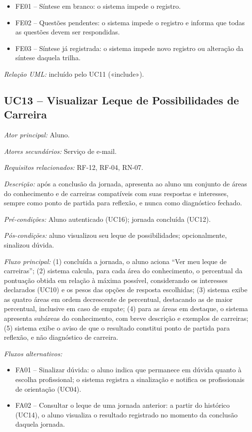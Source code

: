 \begin{itemize}[label={},leftmargin=\parindent,itemsep=0pt,topsep=0pt]
  \item FE01 – Síntese em branco: o sistema impede o registro.
  \item FE02 – Questões pendentes: o sistema impede o registro e informa que todas as questões devem ser respondidas.
  \item FE03 – Síntese já registrada: o sistema impede novo registro ou alteração da síntese daquela trilha.
\end{itemize}

\textit{Relação UML:} incluído pelo UC11 («include»).

\subsection*{UC13 -- Visualizar Leque de Possibilidades de Carreira}\label{uc:uc13}

\textit{Ator principal:} Aluno.

\textit{Atores secundários:} Serviço de e-mail.

\textit{Requisitos relacionados:} RF-12, RF-04, RN-07.

\textit{Descrição:} após a conclusão da jornada, apresenta ao aluno um conjunto de áreas do conhecimento e de carreiras compatíveis com suas respostas e interesses, sempre como ponto de partida para reflexão, e nunca como diagnóstico fechado.

\textit{Pré-condições:} Aluno autenticado (UC16); jornada concluída (UC12).

\textit{Pós-condições:} aluno visualizou seu leque de possibilidades; opcionalmente, sinalizou dúvida.

\textit{Fluxo principal:} (1) concluída a jornada, o aluno aciona ``Ver meu leque de carreiras''; (2) sistema calcula, para cada área do conhecimento, o percentual da pontuação obtida em relação à máxima possível, considerando os interesses declarados (UC10) e os pesos das opções de resposta escolhidas; (3) sistema exibe as quatro áreas em ordem decrescente de percentual, destacando as de maior percentual, inclusive em caso de empate; (4) para as áreas em destaque, o sistema apresenta subáreas do conhecimento, com breve descrição e exemplos de carreiras; (5) sistema exibe o aviso de que o resultado constitui ponto de partida para reflexão, e não diagnóstico de carreira.

\textit{Fluxos alternativos:}

\begin{itemize}[label={},leftmargin=\parindent,itemsep=0pt,topsep=0pt]
  \item FA01 – Sinalizar dúvida: o aluno indica que permanece em dúvida quanto à escolha profissional; o sistema registra a sinalização e notifica os profissionais de orientação (UC04).
  \item FA02 – Consultar o leque de uma jornada anterior: a partir do histórico (UC14), o aluno visualiza o resultado registrado no momento da conclusão daquela jornada.
\end{itemize}

